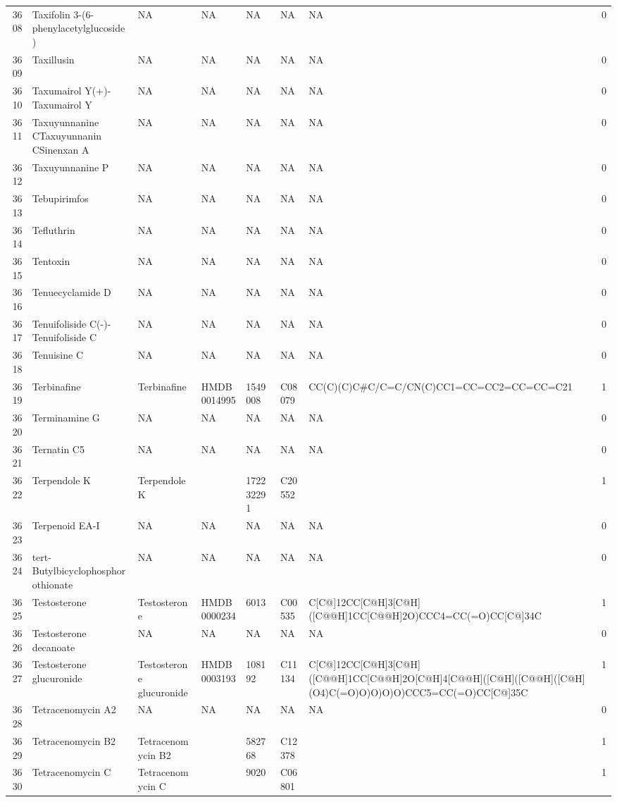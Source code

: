 \documentclass[a4paper]{article}
\begin{document}
\begin{longtable}{rlllllll}
  3608 & Taxifolin 3-(6-phenylacetylglucoside) & NA & NA & NA & NA & NA & 0 \\ 
  3609 & Taxillusin & NA & NA & NA & NA & NA & 0 \\ 
  3610 & Taxumairol Y(+)-Taxumairol Y & NA & NA & NA & NA & NA & 0 \\ 
  3611 & Taxuyunnanine CTaxuyunnanin CSinenxan A & NA & NA & NA & NA & NA & 0 \\ 
  3612 & Taxuyunnanine P & NA & NA & NA & NA & NA & 0 \\ 
  3613 & Tebupirimfos & NA & NA & NA & NA & NA & 0 \\ 
  3614 & Tefluthrin & NA & NA & NA & NA & NA & 0 \\ 
  3615 & Tentoxin & NA & NA & NA & NA & NA & 0 \\ 
  3616 & Tenuecyclamide D & NA & NA & NA & NA & NA & 0 \\ 
  3617 & Tenuifoliside C(-)-Tenuifoliside C & NA & NA & NA & NA & NA & 0 \\ 
  3618 & Tenuisine C & NA & NA & NA & NA & NA & 0 \\ 
  3619 & Terbinafine & Terbinafine & HMDB0014995 & 1549008 & C08079 & CC(C)(C)C\#C/C=C/CN(C)CC1=CC=CC2=CC=CC=C21 & 1 \\ 
  3620 & Terminamine G & NA & NA & NA & NA & NA & 0 \\ 
  3621 & Ternatin C5 & NA & NA & NA & NA & NA & 0 \\ 
  3622 & Terpendole K & Terpendole K &  & 172232291 & C20552 &  & 1 \\ 
  3623 & Terpenoid EA-I & NA & NA & NA & NA & NA & 0 \\ 
  3624 & tert-Butylbicyclophosphorothionate & NA & NA & NA & NA & NA & 0 \\ 
  3625 & Testosterone & Testosterone & HMDB0000234 & 6013 & C00535 & C[C@]12CC[C@H]3[C@H]([C@@H]1CC[C@@H]2O)CCC4=CC(=O)CC[C@]34C & 1 \\ 
  3626 & Testosterone decanoate & NA & NA & NA & NA & NA & 0 \\ 
  3627 & Testosterone glucuronide & Testosterone glucuronide & HMDB0003193 & 108192 & C11134 & C[C@]12CC[C@H]3[C@H]([C@@H]1CC[C@@H]2O[C@H]4[C@@H]([C@H]([C@@H]([C@H](O4)C(=O)O)O)O)O)CCC5=CC(=O)CC[C@]35C & 1 \\ 
  3628 & Tetracenomycin A2 & NA & NA & NA & NA & NA & 0 \\ 
  3629 & Tetracenomycin B2 & Tetracenomycin B2 &  & 582768 & C12378 &  & 1 \\ 
  3630 & Tetracenomycin C & Tetracenomycin C &  & 9020 & C06801 &  & 1 \\ 

\end{longtable}
\end{document}
